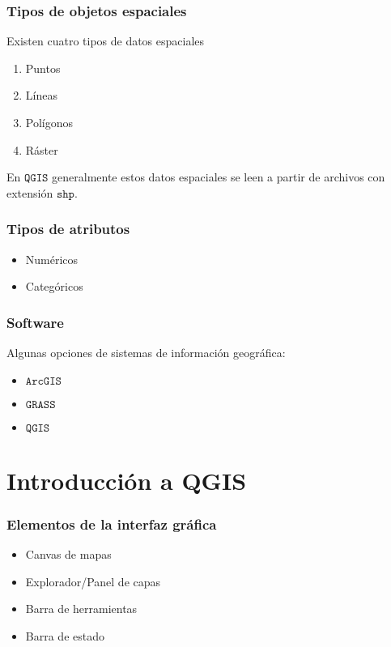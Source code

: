 \documentclass{beamer}
\begin{document}
\begin{frame}
	\frametitle{Tipos de objetos espaciales}
	
	Existen cuatro tipos de datos espaciales 

	\begin{enumerate}
		\item{Puntos}
		\item{Líneas}
		\item{Polígonos}
		\item{Ráster}
	\end{enumerate}	
	
	En $\texttt{QGIS}$ generalmente estos datos espaciales se leen a partir de archivos con extensión $\texttt{shp}$.
	
\end{frame}

\begin{frame}
	\frametitle{Tipos de atributos}

	\begin{itemize}
		\item{Numéricos}
		\item{Categóricos}
	\end{itemize}		
	
\end{frame}



\begin{frame}
	\frametitle{Software}
	
	Algunas opciones de sistemas de información geográfica:

	\begin{itemize}
		\item{$\texttt{ArcGIS}$}	
		\item{$\texttt{GRASS}$}	
		\item{$\texttt{QGIS}$}	
	\end{itemize}
	
\end{frame}


\section{Introducción a QGIS} 

\begin{frame}
	\frametitle{Elementos de la interfaz gráfica}
	
	\begin{itemize}
		\item{Canvas de mapas}
		\item{Explorador/Panel de capas}
		\item{Barra de herramientas}
		\item{Barra de estado}
	\end{itemize}
	
\end{frame}
\end{document}
